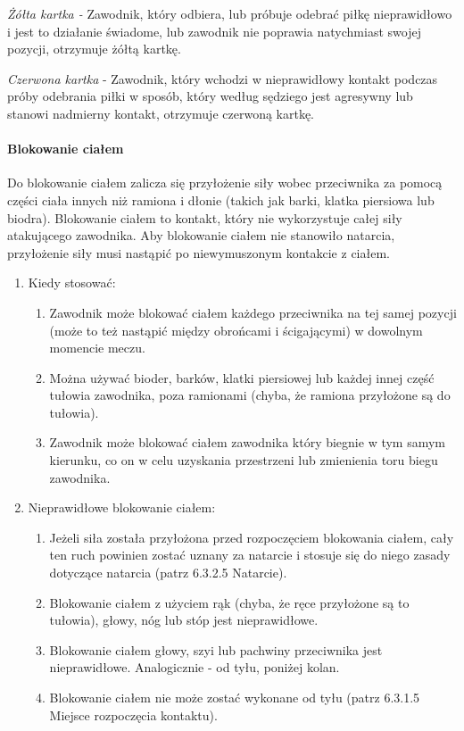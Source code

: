 \documentclass[12pt]{article}
\begin{document}
\emph{Żółta kartka -} Zawodnik, który odbiera, lub próbuje odebrać piłkę
nieprawidłowo i jest to działanie świadome, lub zawodnik nie poprawia
natychmiast swojej pozycji, otrzymuje żółtą kartkę.

\emph{Czerwona kartka} - Zawodnik, który wchodzi w nieprawidłowy kontakt
podczas próby odebrania piłki w sposób, który według sędziego jest
agresywny lub stanowi nadmierny kontakt, otrzymuje czerwoną kartkę.

\paragraph{Blokowanie ciałem}
Do blokowanie ciałem zalicza się
przyłożenie siły wobec przeciwnika za pomocą części ciała innych niż
ramiona i dłonie (takich jak barki, klatka piersiowa lub biodra).
Blokowanie ciałem to kontakt, który nie wykorzystuje całej siły
atakującego zawodnika. Aby blokowanie ciałem nie stanowiło natarcia,
przyłożenie siły musi nastąpić po niewymuszonym kontakcie z ciałem.

\begin{enumerate}
	\item
	      Kiedy stosować:

	      \begin{enumerate}
		      \item
		            Zawodnik może blokować ciałem każdego przeciwnika na tej samej
		            pozycji (może to też nastąpić między obrońcami i ścigającymi) w
		            dowolnym momencie meczu.
		      \item
		            Można używać bioder, barków, klatki piersiowej lub każdej innej
		            część tułowia zawodnika, poza ramionami (chyba, że ramiona
		            przyłożone są do tułowia).
		      \item
		            Zawodnik może blokować ciałem zawodnika który biegnie w tym samym
		            kierunku, co on w celu uzyskania przestrzeni lub zmienienia toru
		            biegu zawodnika.
	      \end{enumerate}
	\item
	      Nieprawidłowe blokowanie ciałem:

	      \begin{enumerate}
		      \item
		            Jeżeli siła została przyłożona przed rozpoczęciem blokowania ciałem,
		            cały ten ruch powinien zostać uznany za natarcie i stosuje się do
		            niego zasady dotyczące natarcia (patrz 6.3.2.5 Natarcie).
		      \item
		            Blokowanie ciałem z użyciem rąk (chyba, że ręce przyłożone są to
		            tułowia), głowy, nóg lub stóp jest nieprawidłowe.
		      \item
		            Blokowanie ciałem głowy, szyi lub pachwiny przeciwnika jest
		            nieprawidłowe. Analogicznie - od tyłu, poniżej kolan.
		      \item
		            Blokowanie ciałem nie może zostać wykonane od tyłu (patrz 6.3.1.5
		            Miejsce rozpoczęcia kontaktu).
	      \end{enumerate}
\end{enumerate}
\end{document}
